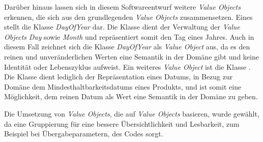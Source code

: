 Darüber hinaus lassen sich in diesem Softwareentwurf weitere \textit{Value Objects} erkennen, die sich aus den grundlegenden \textit{Value Objects} zusammensetzen.
Eines stellt die Klasse \href{}{\code{}}\textit{DayOfYear} dar.
Die Klasse dient der Verwaltung der \textit{Value Objects} \href{}{\code{}}\textit{Day} sowie \href{}{\code{}}\textit{Month} und repräsentiert somit den Tag eines Jahres.
Auch in diesem Fall zeichnet sich die Klasse \href{}{\code{}}\textit{DayOfYear} als \textit{Value Object} aus, da es den reinen und unveränderlichen Werten eine Semantik in der Domäne gibt und keine Identität oder Lebenszyklus aufweist.
Ein weiteres \textit{Value Object} ist die Klasse \href{}{}.
Die Klasse dient lediglich der Repräsentation eines Datums, in Bezug zur Domäne dem Mindesthaltbarkeitsdatums eines Produkts, und ist somit eine Möglichkeit, dem reinen Datum als Wert eine Semantik in der Domäne zu geben.

Die Umsetzung von \textit{Value Objects}, die auf \textit{Value Objects} basieren, wurde gewählt, da eine Gruppierung für eine bessere Übersichtlichkeit und Lesbarkeit, zum Beispiel bei Übergabeparametern, des Codes sorgt.

